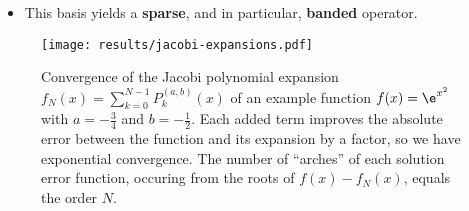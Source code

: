 \begin{itemize}
  \item This basis yields a \textbf{sparse}, and in particular, \textbf{banded} operator.
\end{itemize}

\begin{figure}[H]
  \centering
  \label{fig:jacobi-expansions-error}
  \texttt{[image: results/jacobi-expansions.pdf]}
  \caption[Convergence of Jacobi basis expansion]{Convergence of the Jacobi polynomial expansion $f_N(x) = \sum_{k=0}^{N-1} P_k^{(a, b)}(x)$ of an example function $f(x) = \e^{x^2}$ with $a = -\frac{3}{4}$ and $b = -\frac{1}{2}$. Each added term improves the absolute error between the function and its expansion by a factor, so we have exponential convergence. The number of ``arches'' of each solution error function, occuring from the roots of $f(x) - f_N(x)$, equals the order $N$.}
\end{figure}

